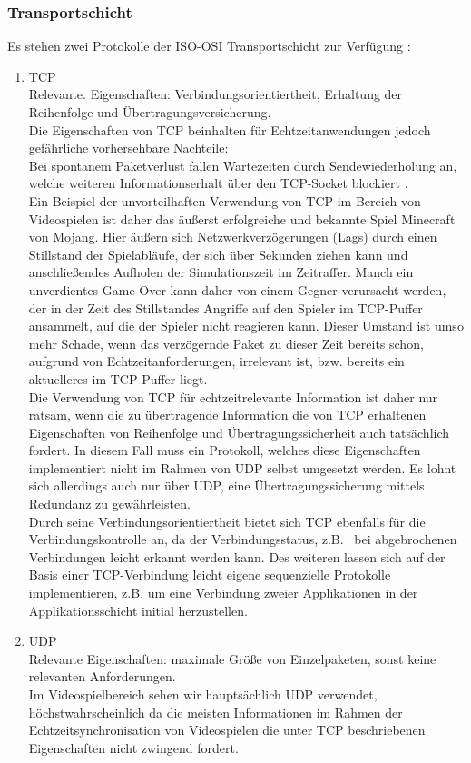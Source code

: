 \documentclass[11pt,twoside,a4paper]{article}
\begin{document}
\subsubsection{Transportschicht}
Es stehen zwei Protokolle der ISO-OSI Transportschicht zur Verfügung \cite[ch.4]{gamenetworking00}:
\begin{enumerate}
\item TCP\\
Relevante. Eigenschaften: Verbindungsorientiertheit, Erhaltung der Reihenfolge und Übertragungsversicherung.\\
	Die Eigenschaften von TCP beinhalten für Echtzeitanwendungen jedoch gefährliche vorhersehbare Nachteile:\\
	Bei spontanem Paketverlust fallen Wartezeiten durch Sendewiederholung an, welche weiteren Informationserhalt über den TCP-Socket blockiert \cite[p.45]{gamenetworking00}.\\
Ein Beispiel der unvorteilhaften Verwendung von TCP im Bereich von Videospielen ist daher das äußerst erfolgreiche und bekannte Spiel Minecraft von Mojang. Hier äußern sich Netzwerkverzögerungen (Lags) durch einen Stillstand der Spielabläufe, der sich über Sekunden ziehen kann und anschließendes Aufholen der Simulationszeit im Zeitraffer. Manch ein unverdientes Game Over kann daher von einem Gegner verursacht werden, der in der Zeit des Stillstandes Angriffe auf den Spieler im TCP-Puffer ansammelt, auf die der Spieler nicht reagieren kann. Dieser Umstand ist umso mehr Schade, wenn das verzögernde Paket zu dieser Zeit bereits schon, aufgrund von Echtzeitanforderungen, irrelevant ist, bzw. bereits ein aktuelleres im TCP-Puffer liegt.\\
Die Verwendung von TCP für echtzeitrelevante Information ist daher nur ratsam, wenn die zu übertragende Information die von TCP erhaltenen Eigenschaften von Reihenfolge und Übertragungssicherheit auch tatsächlich fordert. In diesem Fall muss ein Protokoll, welches diese Eigenschaften implementiert nicht im Rahmen von UDP selbst umgesetzt werden. Es lohnt sich allerdings auch nur über UDP, eine Übertragungssicherung mittels Redundanz zu gewährleisten.\\
Durch seine Verbindungsorientiertheit bietet sich TCP ebenfalls für die Verbindungskontrolle an, da der Verbindungsstatus, z.B.~ bei abgebrochenen Verbindungen leicht erkannt werden kann. Des weiteren lassen sich auf der Basis einer TCP-Verbindung leicht eigene sequenzielle Protokolle implementieren, z.B. um eine Verbindung zweier Applikationen in der Applikationsschicht initial herzustellen.
\item UDP\\
Relevante Eigenschaften: maximale Größe von Einzelpaketen, sonst keine relevanten Anforderungen.\\
	Im Videospielbereich sehen wir hauptsächlich UDP verwendet, höchstwahrscheinlich da die meisten Informationen im Rahmen der Echtzeitsynchronisation von Videospielen die unter TCP beschriebenen Eigenschaften nicht zwingend fordert.
\end{enumerate}
\end{document}
